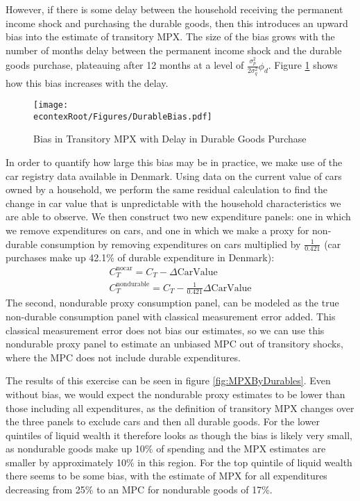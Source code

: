 \documentclass[titlepage]{\econtex}\newcommand{\texname}{ConsumptionHeterogeneity}
\begin{document}
	However, if there is some delay between the household receiving the permanent income shock and purchasing the durable goods, then this introduces an upward bias into the estimate of transitory MPX. The size of the bias grows with the number of months delay between the permanent income shock and the durable goods purchase, plateauing after 12 months at a level of $\frac{\sigma^2_p}{2\sigma^2_q}\phi_d$. Figure \ref{fig:durable_bias} shows how this bias increases with the delay.
	\begin{figure} 
		\begin{centering}
			\texttt{[image: \\econtexRoot/Figures/DurableBias.pdf]}
			\caption{Bias in Transitory MPX with Delay in Durable Goods Purchase}
			\label{fig:durable_bias}
		\end{centering}
	\end{figure}
	
	In order to quantify how large this bias may be in practice, we make use of the car registry data available in Denmark. Using data on the current value of cars owned by a household, we perform the same residual calculation to find the change in car value that is unpredictable with the household characteristics we are able to observe. We then construct two new expenditure panels: one in which we remove expenditures on cars, and one in which we make a proxy for non-durable consumption by removing expenditures on cars multiplied by $\frac{1}{0.421}$ (car purchases make up 42.1\% of durable expenditure in Denmark):
	\begin{align*}
	C_T^{\text{nocar}} = C_T - \Delta \text{CarValue} \\
	C_T^{\text{nondurable}} = C_T - \frac{1}{0.421}\Delta \text{CarValue}
	\end{align*}
	The second, nondurable proxy consumption panel, can be modeled as the true non-durable consumption panel with classical measurement error added. This classical measurement error does not bias our estimates, so we can use this nondurable proxy panel to estimate an unbiased MPC out of transitory shocks, where the MPC does not include durable expenditures.
	
	The results of this exercise can be seen in figure \ref{fig:MPXByDurables}. Even without bias, we would expect the nondurable proxy estimates to be lower than those including all expenditures, as the definition of transitory MPX changes over the three panels to exclude cars and then all durable goods. For the lower quintiles of liquid wealth it therefore looks as though the bias is likely very small, as nondurable goods make up 10\% of spending and the MPX estimates are smaller by approximately 10\% in this region. For the top quintile of liquid wealth there seems to be some bias, with the estimate of MPX for all expenditures decreasing from 25\% to an MPC for nondurable goods of 17\%.
	
\end{document}
